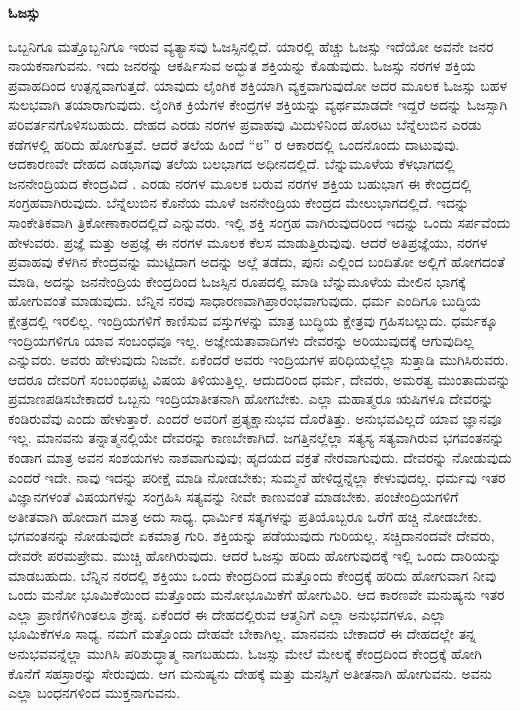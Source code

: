 \begin{center}
\textbf{ಓಜಸ್ಸು}
\end{center}

ಒಬ್ಬನಿಗೂ ಮತ್ತೊಬ್ಬನಿಗೂ ಇರುವ ವ್ಯತ್ಯಾಸವು ಓಜಸ್ಸಿನಲ್ಲಿದೆ. ಯಾರಲ್ಲಿ ಹೆಚ್ಚು ಓಜಸ್ಸು ಇದೆಯೋ ಅವನೇ ಜನರ ನಾಯಕನಾಗುವನು. ಇದು ಜನರನ್ನು ಆಕರ್ಷಿಸುವ ಅದ್ಭುತ ಶಕ್ತಿಯನ್ನು ಕೊಡುವುದು. ಓಜಸ್ಸು ನರಗಳ ಶಕ್ತಿಯ ಪ್ರವಾಹದಿಂದ  ಉತ್ಪನ್ನವಾಗುತ್ತದೆ. ಯಾವುದು ಲೈಂಗಿಕ ಶಕ್ತಿಯಾಗಿ ವ್ಯಕ್ತವಾಗುವುದೋ ಅದರ ಮೂಲಕ ಓಜಸ್ಸು ಬಹಳ ಸುಲಭವಾಗಿ ತಯಾರಾಗುವುದು. ಲೈಂಗಿಕ ಕ್ರಿಯೆಗಳ ಕೇಂದ್ರಗಳ ಶಕ್ತಿಯನ್ನು ವ್ಯರ್ಥಮಾಡದೇ ಇದ್ದರೆ ಅದನ್ನು ಓಜಸ್ಸಾಗಿ ಪರಿವರ್ತನಗೊಳಿಸಬಹುದು. ದೇಹದ ಎರಡು ನರಗಳ ಪ್ರವಾಹವು ಮಿದುಳಿನಿಂದ ಹೊರಟು ಬೆನ್ನೆಲುಬಿನ ಎರಡು ಕಡೆಗಳಲ್ಲಿ ಹರಿದು ಹೋಗುತ್ತವೆ. ಆದರೆ ತಲೆಯ ಹಿಂದೆ “೮” ರ ಆಕಾರದಲ್ಲಿ ಒಂದನೊಂದು ದಾಟುವುವು. ಆದಕಾರಣವೇ ದೇಹದ ಎಡಭಾಗವು ತಲೆಯ ಬಲಭಾಗದ ಅಧೀನದಲ್ಲಿದೆ. ಬೆನ್ನುಮೂಳೆಯ ಕೆಳಭಾಗದಲ್ಲಿ ಜನನೇಂದ್ರಿಯದ ಕೇಂದ್ರವಿದೆ . ಎರಡು ನರಗಳ ಮೂಲಕ ಬರುವ ನರಗಳ ಶಕ್ತಿಯ ಬಹುಭಾಗ ಈ ಕೇಂದ್ರದಲ್ಲಿ ಸಂಗ್ರಹವಾಗಿರುವುದು. ಬೆನ್ನೆಲುಬಿನ ಕೊನೆಯ ಮೂಳೆ ಜನನೇಂದ್ರಿಯ ಕೇಂದ್ರದ ಮೇಲುಭಾಗದಲ್ಲಿದೆ. ಇದನ್ನು ಸಾಂಕೇತಿಕವಾಗಿ ತ್ರಿಕೋಣಾಕಾರದಲ್ಲಿದೆ ಎನ್ನುವರು. ಇಲ್ಲಿ ಶಕ್ತಿ ಸಂಗ್ರಹ ವಾಗಿರುವುದರಿಂದ ಇದನ್ನು ಒಂದು ಸರ್ಪವೆಂದು ಹೇಳುವರು. ಪ್ರಜ್ಞೆ ಮತ್ತು ಅಪ್ರಜ್ಞೆ ಈ ನರಗಳ ಮೂಲಕ ಕೆಲಸ ಮಾಡುತ್ತಿರುವುವು. ಆದರೆ ಅತಿಪ್ರಜ್ಞೆಯು, ನರಗಳ ಪ್ರವಾಹವು ಕೆಳಗಿನ ಕೇಂದ್ರವನ್ನು ಮುಟ್ಟಿದಾಗ ಅದನ್ನು ಅಲ್ಲೆ ತಡೆದು, ಪುನಃ ಎಲ್ಲಿಂದ ಬಂದಿತೋ ಅಲ್ಲಿಗೆ ಹೋಗದಂತೆ ಮಾಡಿ, ಅದನ್ನು ಜನನೇಂದ್ರಿಯ ಕೇಂದ್ರದಿಂದ ಓಜಸ್ಸಿನ ರೂಪದಲ್ಲಿ ಮಾಡಿ ಬೆನ್ನುಮೂಳೆಯ ಮೇಲಿನ ಭಾಗಕ್ಕೆ ಹೋಗುವಂತೆ ಮಾಡುವುದು. ಬೆನ್ನಿನ ನರವು ಸಾಧಾರಣವಾಗಿಪ್ರಾರಂಭವಾಗುವುದು. ಧರ್ಮ ಎಂದಿಗೂ ಬುದ್ಧಿಯ ಕ್ಷೇತ್ರದಲ್ಲಿ ಇರಲಿಲ್ಲ. ಇಂದ್ರಿಯಗಳಿಗೆ ಕಾಣಿಸುವ ವಸ್ತುಗಳನ್ನು ಮಾತ್ರ ಬುದ್ಧಿಯ ಕ್ಷೇತ್ರವು ಗ್ರಹಿಸಬಲ್ಲುದು. ಧರ್ಮಕ್ಕೂ ಇಂದ್ರಿಯಗಳಿಗೂ ಯಾವ ಸಂಬಂಧವೂ ಇಲ್ಲ. ಅಜ್ಞೇಯತಾವಾದಿಗಳು ದೇವರನ್ನು ಅರಿಯುವುದಕ್ಕೆ ಆಗುವುದಿಲ್ಲ ಎನ್ನುವರು. ಅವರು ಹೇಳುವುದು ನಿಜವೇ. ಏಕೆಂದರೆ ಅವರು ಇಂದ್ರಿಯಗಳ ಪರಿಧಿಯಲ್ಲೆಲ್ಲಾ ಸುತ್ತಾಡಿ ಮುಗಿಸಿರುವರು. ಆದರೂ ದೇವರಿಗೆ ಸಂಬಂಧಪಟ್ಟ ವಿಷಯ ತಿಳಿಯುತ್ತಿಲ್ಲ. ಆದುದರಿಂದ ಧರ್ಮ, ದೇವರು, ಅಮರತ್ವ ಮುಂತಾದುವನ್ನು ಪ್ರಮಾಣಪಡಿಸಬೇಕಾದರೆ ಒಬ್ಬನು ಇಂದ್ರಿಯಾತೀತನಾಗಿ ಹೋಗಬೇಕು. ಎಲ್ಲಾ ಮಹಾತ್ಮರೂ ಋಷಿಗಳೂ ದೇವರನ್ನು ಕಂಡಿರುವೆವು ಎಂದು ಹೇಳುತ್ತಾರೆ. ಎಂದರೆ ಅವರಿಗೆ ಪ್ರತ್ಯಕ್ಷಾನುಭವ ದೊರೆತಿತ್ತು. ಅನುಭವವಿಲ್ಲದೆ ಯಾವ ಜ್ಞಾನವೂ ಇಲ್ಲ. ಮಾನವನು ತನ್ನಾತ್ಮನಲ್ಲಿಯೇ ದೇವರನ್ನು ಕಾಣಬೇಕಾಗಿದೆ. ಜಗತ್ತಿನಲ್ಲೆಲ್ಲಾ ಸತ್ಯಸ್ಯ ಸತ್ಯವಾಗಿರುವ ಭಗವಂತನನ್ನು ಕಂಡಾಗ ಮಾತ್ರ ಅವನ ಸಂಶಯಗಳು ನಾಶವಾಗುವುವು; ಹೃದಯದ ವಕ್ರತೆ ನೇರವಾಗುವುದು. ದೇವರನ್ನು ನೋಡುವುದು ಎಂದರೆ ಇದೇ. ನಾವು ಇದನ್ನು ಪರೀಕ್ಷೆ ಮಾಡಿ ನೋಡಬೇಕು; ಸುಮ್ಮನೆ ಹೇಳಿದ್ದನ್ನೆಲ್ಲಾ ಕೇಳುವುದಲ್ಲ. ಧರ್ಮವು ಇತರ ವಿಜ್ಞಾನಗಳಂತೆ ವಿಷಯಗಳನ್ನು ಸಂಗ್ರಹಿಸಿ ಸತ್ಯವನ್ನು ನೀವೇ ಕಾಣುವಂತೆ ಮಾಡಬೇಕು. ಪಂಚೇಂದ್ರಿಯಗಳಿಗೆ ಅತೀತವಾಗಿ ಹೋದಾಗ ಮಾತ್ರ ಅದು ಸಾಧ್ಯ. ಧಾರ್ಮಿಕ ಸತ್ಯಗಳನ್ನು ಪ್ರತಿಯೊಬ್ಬರೂ ಒರೆಗೆ ಹಚ್ಚಿ ನೋಡಬೇಕು. ಭಗವಂತನನ್ನು ನೋಡುವುದೇ ಏಕಮಾತ್ರ ಗುರಿ. ಶಕ್ತಿಯನ್ನು ಪಡೆಯುವುದು ಗುರಿಯಲ್ಲ. ಸಚ್ಚಿದಾನಂದವೇ ದೇವರು, ದೇವರೇ ಪರಮಪ್ರೇಮ. ಮುಚ್ಚಿ ಹೋಗಿರುವುದು. ಆದರೆ ಓಜಸ್ಸು ಹರಿದು ಹೋಗುವುದಕ್ಕೆ ಇಲ್ಲಿ ಒಂದು ದಾರಿಯನ್ನು ಮಾಡಬಹುದು. ಬೆನ್ನಿನ ನರದಲ್ಲಿ ಶಕ್ತಿಯು ಒಂದು ಕೇಂದ್ರದಿಂದ ಮತ್ತೊಂದು ಕೇಂದ್ರಕ್ಕೆ ಹರಿದು ಹೋಗುವಾಗ ನೀವು ಒಂದು ಮನೋ ಭೂಮಿಕೆಯಿಂದ ಮತ್ತೊಂದು ಮನೋಭೂಮಿಕೆಗೆ ಹೋಗುವಿರಿ. ಆದ ಕಾರಣವೇ ಮನುಷ್ಯನು ಇತರ ಎಲ್ಲಾ ಪ್ರಾಣಿಗಳಿಗಿಂತಲೂ ಶ್ರೇಷ್ಠ. ಏಕೆಂದರೆ ಈ ದೇಹದಲ್ಲಿರುವ ಆತ್ಮನಿಗೆ ಎಲ್ಲಾ ಅನುಭವಗಳೂ, ಎಲ್ಲಾ ಭೂಮಿಕೆಗಳೂ ಸಾಧ್ಯ. ನಮಗೆ ಮತ್ತೊಂದು ದೇಹವೇ ಬೇಕಾಗಿಲ್ಲ. ಮಾನವನು ಬೇಕಾದರೆ ಈ ದೇಹದಲ್ಲೇ ತನ್ನ ಅನುಭವವನ್ನೆಲ್ಲಾ ಮುಗಿಸಿ ಪರಿಶುದ್ಧಾತ್ಮ ನಾಗಬಹುದು. ಓಜಸ್ಸು ಮೇಲೆ ಮೇಲಕ್ಕೆ ಕೇಂದ್ರದಿಂದ ಕೇಂದ್ರಕ್ಕೆ ಹೋಗಿ ಕೊನೆಗೆ ಸಹಸ್ರಾರನ್ನು ಸೇರುವುದು. ಆಗ ಮನುಷ್ಯನು ದೇಹಕ್ಕೆ ಮತ್ತು ಮನಸ್ಸಿಗೆ ಅತೀತನಾಗಿ ಹೋಗುವನು. ಅವನು ಎಲ್ಲಾ ಬಂಧನಗಳಿಂದ ಮುಕ್ತನಾಗುವನು.

